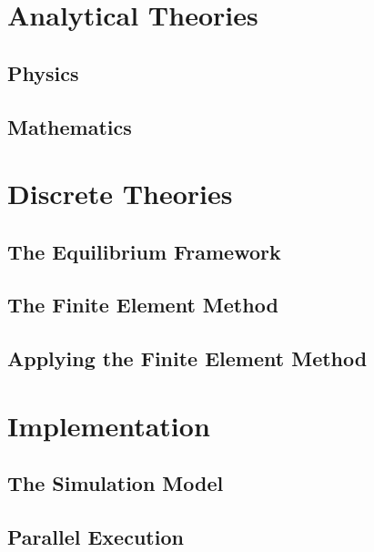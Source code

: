\documentclass[a4paper,twoside,openright]{memoir}
\begin{document}
\doubleblank

\part{Analytical Theories}
\chapter{Physics}
\label{chapter:physics}


\chapter{Mathematics}
\label{chapter:mathematics}



\doubleblank

\part{Discrete Theories}
\chapter{The Equilibrium Framework}
\label{chapter:equilibrium_framwork}


\chapter{The Finite Element Method}
\label{chapter:finite_element_method}


\doubleblank

\chapter{Applying the Finite Element Method}
\label{chapter:applying_finite_element_method}



\part{Implementation}
\chapter{The Simulation Model}
\label{chapter:simulation_model}


\doubleblank

\chapter{Parallel Execution}
\label{chapter:parallel_execution}

\end{document}
